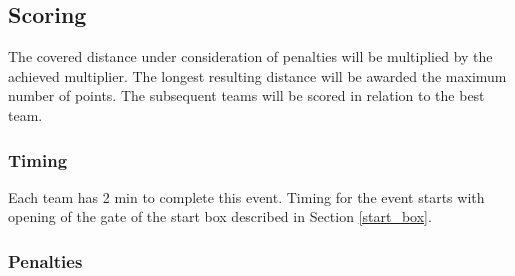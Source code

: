 \documentclass[a4paper]{report}
\begin{document}
\subsection{Scoring}
\begin{mdframed}[linecolor=red,linewidth=2pt]

	\label{obstacle_scoring}

	The covered distance under consideration of penalties will be multiplied by the
	achieved multiplier. The longest resulting distance will be awarded the maximum
	number of points. The subsequent teams will be scored in relation to the best
	team.

	\subsubsection{Timing}

	Each team has 2 min to complete this event. Timing for the event starts with
	opening of the gate of the start box described in Section \ref{start_box}.

	\subsubsection{Penalties}


\end{mdframed}
\end{document}
